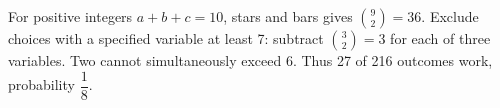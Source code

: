 For positive integers $a+b+c=10$, stars and bars gives $\binom92=36$. Exclude choices with a specified variable at least 7: subtract $\binom32=3$ for each of three variables. Two cannot simultaneously exceed 6. Thus 27 of 216 outcomes work, probability $\boxed{\dfrac{1}{8}}$.
